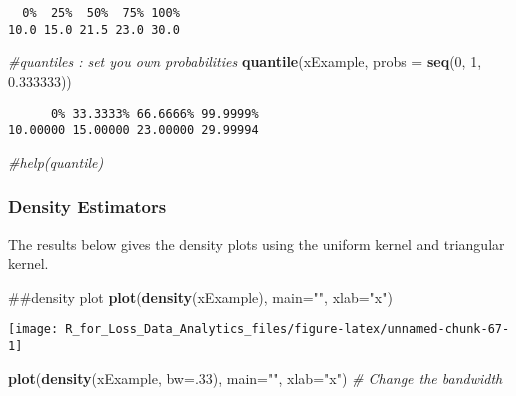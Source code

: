 \documentclass[]{book}
\newenvironment{Shaded}{\begin{snugshade}}{\end{snugshade}}
\newcommand{\KeywordTok}[1]{\textcolor[rgb]{0.13,0.29,0.53}{\textbf{#1}}}
\newcommand{\DataTypeTok}[1]{\textcolor[rgb]{0.13,0.29,0.53}{#1}}
\newcommand{\DecValTok}[1]{\textcolor[rgb]{0.00,0.00,0.81}{#1}}
\newcommand{\FloatTok}[1]{\textcolor[rgb]{0.00,0.00,0.81}{#1}}
\newcommand{\StringTok}[1]{\textcolor[rgb]{0.31,0.60,0.02}{#1}}
\newcommand{\CommentTok}[1]{\textcolor[rgb]{0.56,0.35,0.01}{\textit{#1}}}
\newcommand{\NormalTok}[1]{#1}
\theoremstyle{definition}
\theoremstyle{definition}
\theoremstyle{definition}
\theoremstyle{remark}
\begin{document}
\begin{verbatim}
  0%  25%  50%  75% 100% 
10.0 15.0 21.5 23.0 30.0 
\end{verbatim}

\begin{Shaded}
\begin{Highlighting}[]
\CommentTok{#quantiles : set you own probabilities}
\KeywordTok{quantile}\NormalTok{(xExample, }\DataTypeTok{probs =} \KeywordTok{seq}\NormalTok{(}\DecValTok{0}\NormalTok{, }\DecValTok{1}\NormalTok{, }\FloatTok{0.333333}\NormalTok{))}
\end{Highlighting}
\end{Shaded}

\begin{verbatim}
      0% 33.3333% 66.6666% 99.9999% 
10.00000 15.00000 23.00000 29.99994 
\end{verbatim}

\begin{Shaded}
\begin{Highlighting}[]
\CommentTok{#help(quantile)}
\end{Highlighting}
\end{Shaded}

\subsubsection{Density Estimators}\label{density-estimators}

The results below gives the density plots using the uniform kernel and
triangular kernel.

\begin{Shaded}
\begin{Highlighting}[]
\NormalTok{##density plot }
\KeywordTok{plot}\NormalTok{(}\KeywordTok{density}\NormalTok{(xExample), }\DataTypeTok{main=}\StringTok{""}\NormalTok{, }\DataTypeTok{xlab=}\StringTok{"x"}\NormalTok{)}
\end{Highlighting}
\end{Shaded}

\begin{center}\texttt{[image: R\_for\_Loss\_Data\_Analytics\_files/figure-latex/unnamed-chunk-67-1]} \end{center}

\begin{Shaded}
\begin{Highlighting}[]
\KeywordTok{plot}\NormalTok{(}\KeywordTok{density}\NormalTok{(xExample, }\DataTypeTok{bw=}\NormalTok{.}\DecValTok{33}\NormalTok{), }\DataTypeTok{main=}\StringTok{""}\NormalTok{, }\DataTypeTok{xlab=}\StringTok{"x"}\NormalTok{) }\CommentTok{# Change the bandwidth}
\end{Highlighting}
\end{Shaded}
\end{document}
